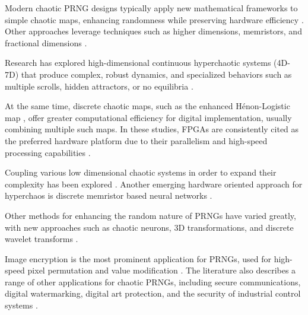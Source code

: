 \documentclass[preprint, 12pt, sort&compress]{elsarticle}
\begin{document}
Modern chaotic PRNG designs typically apply new mathematical frameworks to simple chaotic maps, enhancing randomness while preserving hardware efficiency \cite{luo_design_2024,sun_dynamic_2025}. Other approaches leverage techniques such as higher dimensions, memristors, and fractional dimensions \cite{moussa_ultra_2026,fraga_design_2025}.

Research has explored high-dimensional continuous hyperchaotic systems (4D-7D) that produce complex, robust dynamics, and specialized behaviors such as multiple scrolls, hidden attractors, or no equilibria \cite{vaidyanathan_new_2021, benkouider_novel_2024,yang_hidden_2019, dong_hidden_2022, al-talib_new_2023}. 
 
At the same time, discrete chaotic maps, such as the enhanced Hénon-Logistic map \cite{hussein_new_2018}, offer greater computational efficiency for digital implementation, usually combining multiple such maps. In these studies, FPGAs are consistently cited as the preferred hardware platform due to their parallelism and high-speed processing capabilities \cite{dridi_design_2023,zhang_1D_2025}.

Coupling various low dimensional chaotic systems in order to expand their complexity has been explored \cite{tang_1D_2025,tang_2D_2025}. Another emerging hardware oriented approach for hyperchaos is discrete memristor based neural networks \cite{bao_grid_2025, bao_app_2025}.

Other methods for enhancing the random nature of PRNGs have varied greatly, with new approaches such as chaotic neurons, 3D transformations, and discrete wavelet transforms \cite{tlelo-cuautle_chaotic_2020, zhang_color_2022, kaibou_real-time_2021}.


Image encryption is the most prominent application for PRNGs, used for high-speed pixel permutation and value modification \cite{el-latif_novel_2022,gafsi_improved_2020,ayad_robust_2024}.
The literature also describes a range of other applications for chaotic PRNGs, including secure communications, digital watermarking, digital art protection, and the security of industrial control systems \cite{kaibou_real-time_2021, hobincu_fpga_2018,  shi_chaos-based_2024, perez-resa_chaotic_2019}. 
\end{document}
